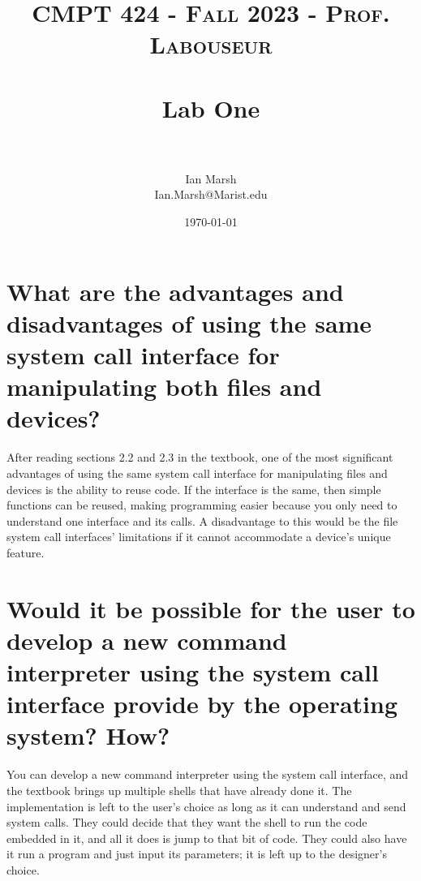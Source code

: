 \documentclass[10pt]{article}
\title{	
   \normalfont \normalsize 
   \textsc{CMPT 424 - Fall 2023 - Prof. Labouseur} \\[10pt] %
   \horrule{0.5pt} \\[0.25cm] 	%
   \huge Lab One  \\     	    %
   \horrule{0.5pt} \\[0.25cm] 	%
}
\author{Ian Marsh \\ \normalsize Ian.Marsh@Marist.edu}
\date{\normalsize\today} 	%
\begin{document}
\maketitle %

\maketitle

\section{What are the advantages and disadvantages of using the same system call interface
for manipulating both files and devices?}
After reading sections 2.2 and 2.3 in the textbook, one of the most significant advantages of using the same system call interface for manipulating files and devices is the ability to reuse code. If the interface is the same, then simple functions can be reused, making programming easier because you only need to understand one interface and its calls. A disadvantage to this would be the file system call interfaces' limitations if it cannot accommodate a device's unique feature. 

\section{Would it be possible for the user to develop a new command interpreter using the
system call interface provide by the operating system? How?}
You can develop a new command interpreter using the system call interface, and the textbook brings up multiple shells that have already done it. The implementation is left to the user's choice as long as it can understand and send system calls. They could decide that they want the shell to run the code embedded in it, and all it does is jump to that bit of code. They could also have it run a program and just input its parameters; it is left up to the designer's choice.
\end{document}
